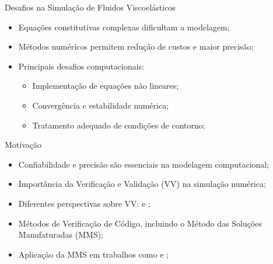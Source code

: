 \begin{frame}{Desafios na Simulação de Fluidos Viscoelásticos}
\begin{itemize}
    \item Equações constitutivas complexas dificultam a modelagem;
    \item Métodos numéricos permitem redução de custos e maior precisão;
    \item Principais desafios computacionais:
    \begin{itemize}
        \item Implementação de equações não lineares;
        \item Convergência e estabilidade numérica;
        \item Tratamento adequado de condições de contorno;
    \end{itemize}
\end{itemize}
\end{frame}

\begin{frame}{Motivação}
\begin{itemize}
    \item Confiabilidade e precisão são essenciais na modelagem computacional;
    \item Importância da Verificação e Validação (VV) na simulação numérica;
    \item Diferentes perspectivas sobre VV: \cite{oberkampftech} e \cite{Roache2002};
    \item Métodos de Verificação de Código, incluindo o Método das Soluções Manufaturadas (MMS);
    \item Aplicação da MMS em trabalhos como \cite{shih1989effects} e \cite{oberkampftech};
\end{itemize}
\end{frame}

